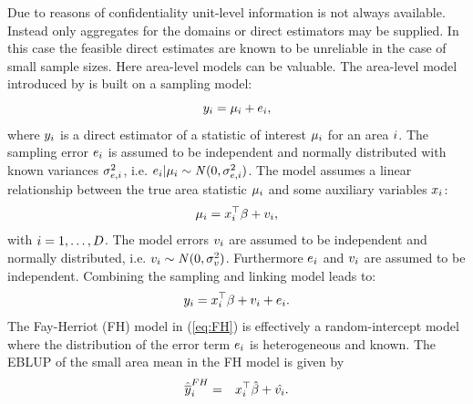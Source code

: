 \documentclass[article]{ajs}
\begin{document}
Due to reasons of confidentiality unit-level information is not always available. Instead only aggregates for the domains or direct estimators may be supplied. In this case the feasible direct estimates are known to be unreliable in the case of small sample sizes. Here area-level models can be valuable. The area-level model introduced by \cite{fay79} is built on a sampling model:
%
\[y_{i} = \mu_{i} + e_{i},\]
%
where $y_{i}$ is a direct estimator of a statistic of interest $\mu_{i}$ for an area $i$. The sampling error $e_{i}$ is assumed to be independent and normally distributed with known variances $\sigma_{e, i}^2$, i.e. $e_{i}|\mu_{i} \sim \mathit{N}(0, \sigma_{e, i}^2)$. The model assumes a linear relationship between the true area statistic $\mu_{i}$ and some auxiliary variables $x_{i}$:
%
\[\mu_{i} = x_{i}^\top \beta + v_{i},\] 
%
with $i=1,\dots, D$. 
The model errors $v_{i}$ are assumed to be independent and normally distributed, i.e. $v_{i} \sim \mathit{N}(0, \sigma_v^2)$. Furthermore $e_{i}$ and $v_{i}$ are assumed to be independent. Combining the sampling and linking model leads to:
\begin{equation}
\label{eq:FH}
y_{i} = x_{i}^\top \beta + v_{i} + e_{i}.
\end{equation} 
%
The Fay-Herriot (FH) model in (\ref{eq:FH}) is effectively a random-intercept model where the distribution of the error term $e_{i}$ is heterogeneous and known. The EBLUP of the small area mean in the FH model is given by 
\begin{eqnarray}\label{FHEBLUP}\hat{\overline{y}}_i^{FH}&=&x_{i}^\top \hat{\beta} + \hat{v_{i}}.
\end{eqnarray}
\end{document}
